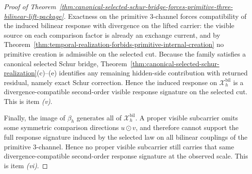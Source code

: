\begin{proof}[Proof of Theorem~\ref{thm:canonical-selected-schur-bridge-forces-primitive-three-bilinear-lift-package}]
Exactness on the primitive \(3\)-channel forces compatibility of the induced
bilinear response with divergence on the lifted carrier: the visible source on
each comparison factor is already an exchange current, and by
Theorem~\ref{thm:temporal-realization-forbids-primitive-internal-creation} no
primitive creation is admissible on the selected cut. Because the family
satisfies a canonical selected Schur bridge,
Theorem~\ref{thm:canonical-selected-schur-realization}(c)--(e) identifies any
remaining hidden-side contribution with returned residual, namely exact Schur
correction. Hence the induced response on
\(\mathcal X_h^{\mathrm{bil}}\) is a divergence-compatible second-order visible
response signature on the selected cut. This is item \emph{(v)}.

Finally, the image of \(\beta_h\) generates all of
\(\mathcal X_h^{\mathrm{bil}}\). A proper visible subcarrier omits some
symmetric comparison directions \(u\odot v\), and therefore cannot support the
full response signature induced by the selected law on all bilinear couplings of
the primitive \(3\)-channel. Hence no proper visible subcarrier still carries
that same divergence-compatible second-order response signature at the observed
scale. This is item \emph{(vi)}.
\end{proof}

